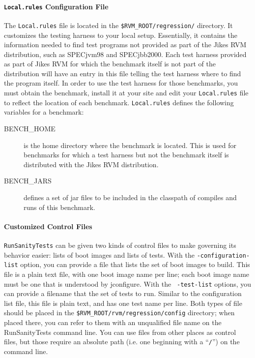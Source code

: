 \paragraph{\texttt{\textbf{Local.rules}} Configuration File}

 The {\tt Local.rules} file is located in the
 {\tt \$RVM\_\-ROOT/\-re\-gres\-sion/} directory.
It customizes the testing harness to your local
setup.  Essentially, it contains the information needed to find test
programs not provided as part of the Jikes RVM distribution, such as
SPECjvm\Rweb{}98 and SPECjbb\Rboth{}2000.  Each test harness
provided as part of Jikes RVM for which the benchmark itself is
not part of the distribution will have an entry in this file telling
the test harness where to find the program itself.  In order to use
the test harness for those benchmarks, you must obtain the benchmark,
install it at your site and edit your {\tt{Local.rules}} file to
reflect the location of each benchmark.  {\tt{Local.rules}} defines
the following variables for a benchmark:
\begin{description}
\item[BENCH\_HOME] is the home directory where the benchmark is
located.  This is used for benchmarks for which a test harness but not
the benchmark itself is distributed with the Jikes RVM distribution. 
\item[BENCH\_JARS] defines a set of jar files to be included in the
classpath of compiles and runs of this benchmark.
\end{description}

\paragraph{Customized Control Files}

 {\tt{RunSanityTests}} can be given two kinds of control files to make
governing its behavior easier: lists of boot images and lists of
tests.  With the {\tt -con\-fi\-gu\-ra\-tion-list} option, you can provide a
file that lists the set of boot images to build.  This file is a plain
text file, with one boot image name per line; each boot image name
must be one that is understood by jconfigure.  With the {\tt
-test-list} options, you can provide a filename that the set of tests
to run.  Similar to the configuration list file, this file is plain
text, and has one test name per line.  Both types of file should be
placed in the {\tt \$RVM\_\-ROOT/rvm/regression/config} directory; when placed
there, you can refer to them with an unqualified file name on the
RunSanityTests command line.  You can use files from other places as
control files, but those require an absolute path (i.e. one beginning
with a ``{\tt /}'') on the command line.


